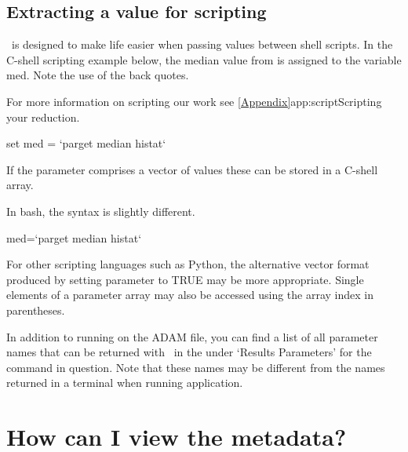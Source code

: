 \documentclass[11pt,oneside,chapters]{starlink}
\begin{document}
\subsection{Extracting a value for scripting}
\label{sec:parget}

\parget\ is designed to make life easier when passing values between
shell scripts. In the C-shell scripting example below, the median
value from  is assigned to the variable med.  Note the
use of the back quotes.

For more information on scripting our work see
\cref{Appendix}{app:script}{Scripting your reduction}.

\begin{terminalv}
set med = `parget median histat`
\end{terminalv}

If the parameter comprises a vector of values these can be stored in a
C-shell array.

In bash, the syntax is slightly different.
\begin{terminalv}
med=`parget median histat`
\end{terminalv}

For other scripting languages such as Python, the alternative vector
format produced by setting parameter  to TRUE may be more
appropriate. Single elements of a parameter array may also be accessed
using the array index in parentheses.

In addition to running  on the ADAM file, you can find
a list of all parameter names that can be returned with \parget\ in
the  under `Results Parameters'
for the command in question. Note that these names may be different
from the names returned in a terminal when running application.

\section{How can I view the metadata?}
\label{sec:fitslist}
\end{document}
